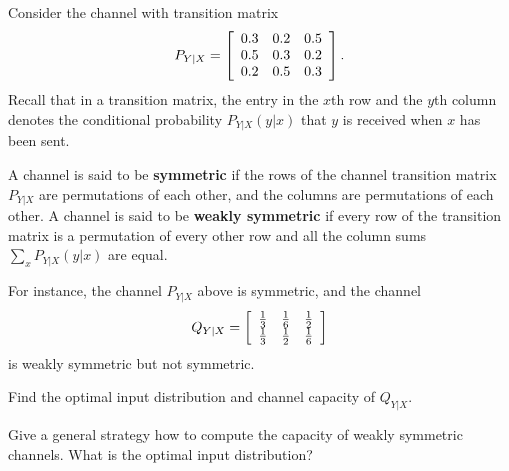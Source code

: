 \documentclass[a4paper,10pt,landscape,twocolumn]{scrartcl}
\begin{document}
\begin{exercise}
Consider the channel with transition matrix
\[
P_{Y|X} = \left[
\begin{array}{c c c}
0.3&0.2&0.5\\
0.5&0.3&0.2\\
0.2&0.5&0.3
\end{array}
\right].
\]
Recall that in a transition matrix, the entry in the $x$th row and the $y$th column denotes the conditional probability $P_{Y|X}(y|x)$ that $y$ is received when $x$ has been sent.

A channel is said to be \textbf{symmetric} if the rows of the channel transition matrix $P_{Y|X}$ are permutations of each other, and the columns are permutations of each other. A channel is said to be \textbf{weakly symmetric} if every row of the transition matrix is a permutation of every other row and all the column sums $\sum_x P_{Y|X}(y|x)$ are equal.

For instance, the channel $P_{Y|X}$ above is symmetric, and the channel
\[
Q_{Y|X} = \left[
\begin{array}{c c c}
\frac{1}{3}&\frac{1}{6}&\frac{1}{2}\\
\frac{1}{3}&\frac{1}{2}&\frac{1}{6}
\end{array}
\right]
\]
is weakly symmetric but not symmetric.
	\begin{subex}
	Find the optimal input distribution and channel capacity of $Q_{Y|X}$.
	\end{subex}
	\begin{subex}
	Give a general strategy how to compute the capacity of weakly symmetric channels. What is the optimal input distribution?
	\end{subex}
\end{exercise}
\end{document}
